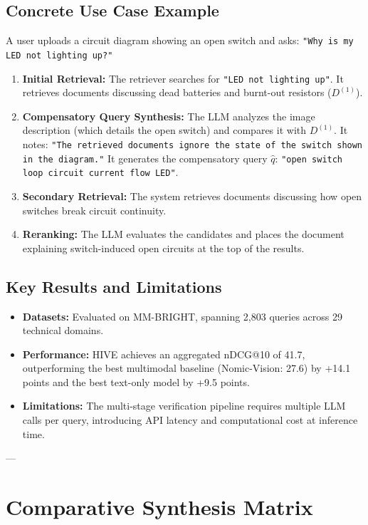 \documentclass[11pt,a4paper]{article}
\begin{document}
\subsection{Concrete Use Case Example}
A user uploads a circuit diagram showing an open switch and asks: \texttt{"Why is my LED not lighting up?"}
\begin{enumerate}
    \item \textbf{Initial Retrieval:} The retriever searches for \texttt{"LED not lighting up"}. It retrieves documents discussing dead batteries and burnt-out resistors ($D^{(1)}$).
    \item \textbf{Compensatory Query Synthesis:} The LLM analyzes the image description (which details the open switch) and compares it with $D^{(1)}$. It notes: \texttt{"The retrieved documents ignore the state of the switch shown in the diagram."} It generates the compensatory query $\hat{q}$: \texttt{"open switch loop circuit current flow LED"}.
    \item \textbf{Secondary Retrieval:} The system retrieves documents discussing how open switches break circuit continuity.
    \item \textbf{Reranking:} The LLM evaluates the candidates and places the document explaining switch-induced open circuits at the top of the results.
\end{enumerate}

\subsection{Key Results and Limitations}
\begin{itemize}
    \item \textbf{Datasets:} Evaluated on MM-BRIGHT, spanning 2,803 queries across 29 technical domains.
    \item \textbf{Performance:} HIVE achieves an aggregated nDCG@10 of 41.7, outperforming the best multimodal baseline (Nomic-Vision: 27.6) by +14.1 points and the best text-only model by +9.5 points.
    \item \textbf{Limitations:} The multi-stage verification pipeline requires multiple LLM calls per query, introducing API latency and computational cost at inference time.
\end{itemize}

---

\section{Comparative Synthesis Matrix}
\label{sec:comparative_table}
\end{document}
